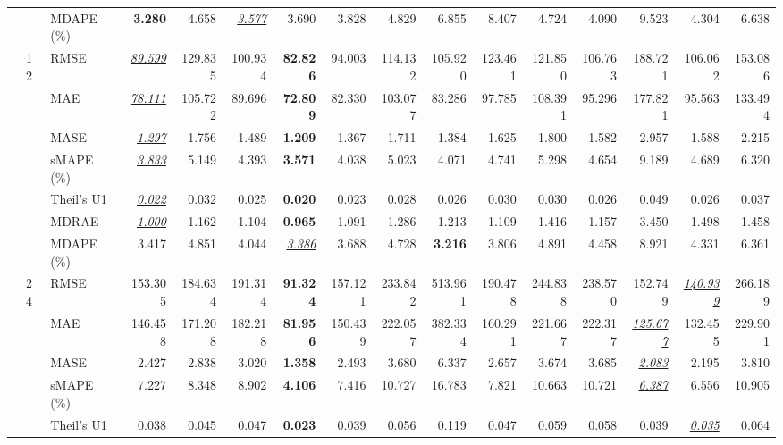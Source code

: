 \begin{table}[!htbp]
{\begin{tabular}{lllrrrrrrrrrrrrr}
 &  & MDAPE (\%) & \textbf{3.280} & 4.658 & \underline{\textit{3.577}} & 3.690 & 3.828 & 4.829 & 6.855 & 8.407 & 4.724 & 4.090 & 9.523 & 4.304 & 6.638 \\
\cmidrule(lr){2-16}
 & 12 & RMSE & \underline{\textit{89.599}} & 129.835 & 100.934 & \textbf{82.826} & 94.003 & 114.132 & 105.920 & 123.461 & 121.850 & 106.763 & 188.721 & 106.062 & 153.086 \\
 &  & MAE & \underline{\textit{78.111}} & 105.722 & 89.696 & \textbf{72.809} & 82.330 & 103.077 & 83.286 & 97.785 & 108.391 & 95.296 & 177.821 & 95.563 & 133.494 \\
 &  & MASE & \underline{\textit{1.297}} & 1.756 & 1.489 & \textbf{1.209} & 1.367 & 1.711 & 1.384 & 1.625 & 1.800 & 1.582 & 2.957 & 1.588 & 2.215 \\
 &  & sMAPE (\%) & \underline{\textit{3.833}} & 5.149 & 4.393 & \textbf{3.571} & 4.038 & 5.023 & 4.071 & 4.741 & 5.298 & 4.654 & 9.189 & 4.689 & 6.320 \\
 &  & Theil's U1 & \underline{\textit{0.022}} & 0.032 & 0.025 & \textbf{0.020} & 0.023 & 0.028 & 0.026 & 0.030 & 0.030 & 0.026 & 0.049 & 0.026 & 0.037 \\
 &  & MDRAE & \underline{\textit{1.000}} & 1.162 & 1.104 & \textbf{0.965} & 1.091 & 1.286 & 1.213 & 1.109 & 1.416 & 1.157 & 3.450 & 1.498 & 1.458 \\
 &  & MDAPE (\%) & 3.417 & 4.851 & 4.044 & \underline{\textit{3.386}} & 3.688 & 4.728 & \textbf{3.216} & 3.806 & 4.891 & 4.458 & 8.921 & 4.331 & 6.361 \\
\cmidrule(lr){2-16}
 & 24 & RMSE & 153.305 & 184.634 & 191.314 & \textbf{91.324} & 157.121 & 233.842 & 513.961 & 190.478 & 244.838 & 238.570 & 152.749 & \underline{\textit{140.939}} & 266.189 \\
 &  & MAE & 146.458 & 171.208 & 182.218 & \textbf{81.956} & 150.439 & 222.057 & 382.334 & 160.291 & 221.667 & 222.317 & \underline{\textit{125.677}} & 132.455 & 229.901 \\
 &  & MASE & 2.427 & 2.838 & 3.020 & \textbf{1.358} & 2.493 & 3.680 & 6.337 & 2.657 & 3.674 & 3.685 & \underline{\textit{2.083}} & 2.195 & 3.810 \\
 &  & sMAPE (\%) & 7.227 & 8.348 & 8.902 & \textbf{4.106} & 7.416 & 10.727 & 16.783 & 7.821 & 10.663 & 10.721 & \underline{\textit{6.387}} & 6.556 & 10.905 \\
 &  & Theil's U1 & 0.038 & 0.045 & 0.047 & \textbf{0.023} & 0.039 & 0.056 & 0.119 & 0.047 & 0.059 & 0.058 & 0.039 & \underline{\textit{0.035}} & 0.064 \\

\end{tabular}}
\end{table}
